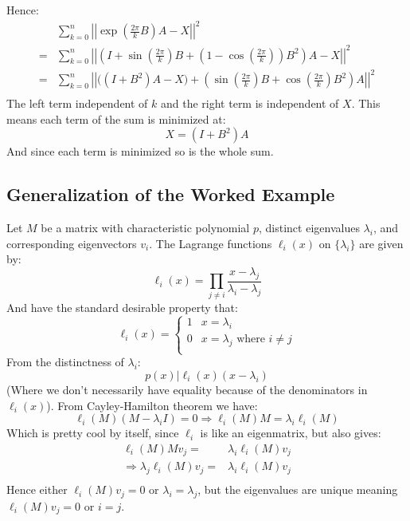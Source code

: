Hence:
\begin{equation*}
\begin{aligned}
&\sum_{k=0}^n\left|\left|\exp\left(\frac{2\pi}{k}B\right)A-X\right|\right|^2\\
=&\sum_{k=0}^n\left|\left|\left(I+\sin\left(\frac{2\pi}{k}\right)B+\left(1-\cos\left(\frac{2\pi}{k}\right)\right)B^2\right)A-X\right|\right|^2\\
=&\sum_{k=0}^n\left|\left|\bigg((I+B^2)A-X\bigg)+\left(\sin\left(\frac{2\pi}{k}\right)B+\cos\left(\frac{2\pi}{k}\right)B^2\right)A\right|\right|^2\\
\end{aligned}
\end{equation*}
The left term independent of $k$ and the right term is independent of $X$.
This means each term of the sum is minimized at:
\[X=(I+B^2)A\]
And since each term is minimized so is the whole sum.

\subsection{Generalization of the Worked Example}
Let $M$ be a matrix with characteristic polynomial $p$, distinct eigenvalues $\lambda_i$, and corresponding eigenvectors $v_i$.
The Lagrange functions $\ell_i(x)$ on $\{\lambda_i\}$ are given by:
\[\ell_i(x) = \prod_{j\neq i} \frac{x-\lambda_j}{\lambda_i-\lambda_j}\]
And have the standard desirable property that:
\[\ell_i(x) = \begin{cases} 1&x=\lambda_i\\0&x=\lambda_j \text{ where } i\neq j\\\end{cases}\]
From the distinctness of $\lambda_i$:
\[p(x) | \ell_i(x)(x-\lambda_i)\]
(Where we don't necessarily have equality because of the denominators in $\ell_i(x)$).
From Cayley-Hamilton theorem we have:
\[\ell_i(M)(M-\lambda_iI) = 0 \Rightarrow \ell_i(M)M=\lambda_i\ell_i(M)\]
Which is pretty cool by itself,
since $\ell_i$ is like an eigenmatrix,
but also gives:
\begin{equation*}
\begin{aligned}
	\ell_i(M)Mv_j =& \lambda_i\ell_i(M)v_j \\
	\Rightarrow\lambda_j\ell_i(M)v_j =& \lambda_i\ell_i(M)v_j \\
\end{aligned}
\end{equation*}
Hence either $\ell_i(M)v_j =0$ or $\lambda_i=\lambda_j$,
but the eigenvalues are unique meaning $\ell_i(M)v_j = 0$ or $i=j$.
\\

